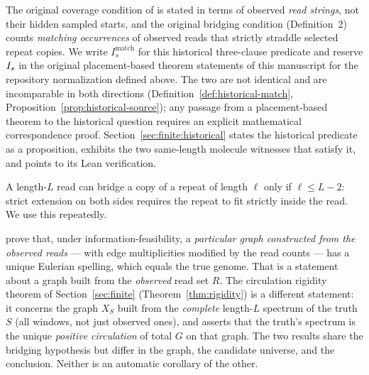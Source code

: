\begin{remark}
\label{rem:historical-coverage}
The original coverage condition of \textcite[Supplement, \S6.4, Definition~1]{shomorony2016} is stated in terms
of observed \emph{read strings}, not their hidden sampled starts, and the
original bridging condition (Definition~2) counts \emph{matching occurrences}
of observed reads that strictly straddle selected repeat copies. We write
$I_s^{\mathrm{match}}$ for this historical three-clause predicate and reserve
$I_s$ in the original placement-based theorem statements of this manuscript for
the repository normalization defined above. The two are not identical and are
incomparable in both directions (Definition~\ref{def:historical-match},
Proposition~\ref{prop:historical-source}); any passage from a placement-based
theorem to the historical question requires an explicit mathematical correspondence proof.
Section~\ref{sec:finite:historical} states the historical predicate as a
proposition, exhibits the two same-length molecule witnesses that satisfy it,
and points to its Lean verification.
\end{remark}

A length-$L$ read can bridge a copy of a repeat of length $\ell$ only if
$\ell \le L-2$: strict extension on both sides requires the repeat to fit
strictly inside the read. We use this repeatedly.

\begin{remark}
\label{rem:2016-vs-rigidity}
\textcite{shomorony2016} prove that, under information-feasibility,
a \emph{particular graph constructed from the observed reads} --- with edge
multiplicities modified by the read counts --- has a unique Eulerian spelling,
which equals the true genome. That is a statement about a graph built from the
\emph{observed} read set $R$. The circulation rigidity theorem of
Section~\ref{sec:finite} (Theorem~\ref{thm:rigidity}) is a different statement:
it concerns the graph $X_S$ built from the \emph{complete} length-$L$ spectrum
of the truth $S$ (all windows, not just observed ones), and asserts that the
truth's spectrum is the unique \emph{positive circulation} of total $G$ on that
graph. The two results share the bridging hypothesis but differ in the graph,
the candidate universe, and the conclusion. Neither is an automatic corollary of the other.
\end{remark}

